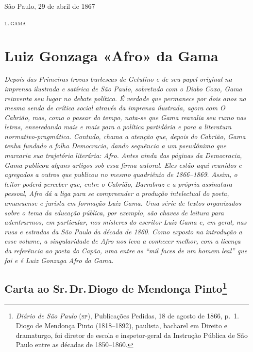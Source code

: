 \begin{flushright}
São Paulo, 29 de abril de 1867

\textsc{l.\,gama}
\end{flushright}

\part{Luiz Gonzaga «Afro» da Gama} %

\begin{argumento}\itshape
{}
Depois das \textnormal{Primeiras trovas burlescas de Getulino} e de seu papel
original na imprensa ilustrada e satírica de São Paulo, sobretudo com o
\textnormal{Diabo Coxo}, Gama reinventa seu lugar no debate político. É verdade
que permanece por dois anos na mesma senda de crítica social através da
imprensa ilustrada, agora com \textnormal{O Cabrião}, mas, como o passar do
tempo, nota-se que Gama reavalia seu rumo nas letras, enveredando mais e
mais para a política partidária e para a literatura
normativo-pragmática. Contudo, chama a atenção que, depois do
\textnormal{Cabrião}, Gama tenha fundado a folha \textnormal{Democracia}, dando
sequência a um pseudônimo que marcaria sua trajetória literária:
Afro. Antes ainda das páginas da \textnormal{Democracia}, Gama publicou
alguns artigos sob essa firma autoral. Eles estão aqui reunidos e
agregados a outros que publicou no mesmo quadriênio de 1866--1869. Assim,
o leitor poderá perceber que, entre o \textnormal{Cabrião}, Barrabraz e
a própria assinatura pessoal, Afro dá a liga para se compreender
a produção intelectual do poeta, amanuense e jurista em formação Luiz
Gama. Uma série de textos organizados sobre o tema da educação pública,
por exemplo, são chaves de leitura para adentrarmos, em particular, nos
misteres do escritor Luiz Gama e, em geral, nas ruas e estradas da São
Paulo da década de 1860. Como exposto na introdução a esse volume, a
singularidade de Afro nos leva a conhecer melhor, com a licença
da referência ao poeta do Capão, uma entre as ``mil faces de um homem
leal'' que foi e é Luiz Gonzaga Afro da Gama.
\end{argumento}

\chapter{Carta ao Sr.\,Dr.\,Diogo de Mendonça Pinto\footnote{\emph{Diário
  de São Paulo} (\textsc{sp}), Publicações Pedidas, 18 de agosto de 1866, p.~1. Diogo de
  Mendonça Pinto (1818--1892), paulista, bacharel em Direito e
  dramaturgo, foi diretor de escola e inspetor-geral da Instrução
  Pública de São Paulo entre as décadas de 1850--1860.}}


